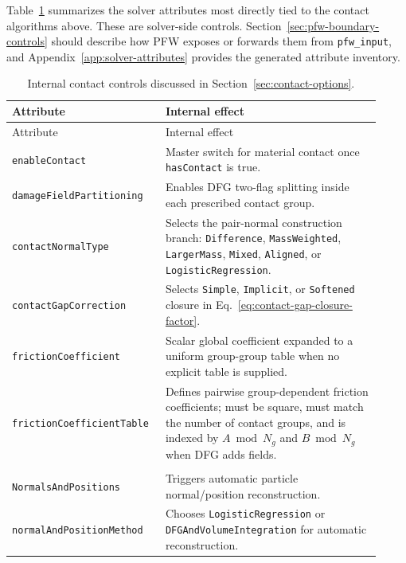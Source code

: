 Table~\ref{tab:contact-input-summary-theory} summarizes the solver attributes most directly tied to the contact algorithms above.  These are solver-side controls.  Section~\ref{sec:pfw-boundary-controls} should describe how PFW exposes or forwards them from \texttt{pfw\_input}, and Appendix~\ref{app:solver-attributes} provides the generated attribute inventory.

\begingroup\small
\begin{longtable}{>{\raggedright\arraybackslash}p{0.36\linewidth}>{\raggedright\arraybackslash}p{0.56\linewidth}}
\caption{Internal contact controls discussed in Section~\ref{sec:contact-options}.}\label{tab:contact-input-summary-theory}\\
\toprule
Attribute & Internal effect \\
\midrule
\endfirsthead
\toprule
Attribute & Internal effect \\
\midrule
\endhead
\texttt{enableContact} & Master switch for material contact once \texttt{hasContact} is true. \\
\texttt{damageFieldPartitioning} & Enables DFG two-flag splitting inside each prescribed contact group. \\
\texttt{contactNormalType} & Selects the pair-normal construction branch: \texttt{Difference}, \texttt{MassWeighted}, \texttt{LargerMass}, \texttt{Mixed}, \texttt{Aligned}, or \texttt{LogisticRegression}. \\
\texttt{contactGapCorrection} & Selects \texttt{Simple}, \texttt{Implicit}, or \texttt{Softened} closure in Eq.~\eqref{eq:contact-gap-closure-factor}. \\
\texttt{frictionCoefficient} & Scalar global coefficient expanded to a uniform group-group table when no explicit table is supplied. \\
\texttt{frictionCoefficientTable} & Defines pairwise group-dependent friction coefficients; must be square, must match the number of contact groups, and is indexed by $A\bmod N_g$ and $B\bmod N_g$ when DFG adds fields. \\
\begin{tabular}[t]{@{}l@{}}\texttt{computeParticleSurface}\\\texttt{NormalsAndPositions}\end{tabular} & Triggers automatic particle normal/position reconstruction. \\
\texttt{normalAndPositionMethod} & Chooses \texttt{LogisticRegression} or \texttt{DFGAndVolumeIntegration} for automatic reconstruction. \\

\end{longtable}
